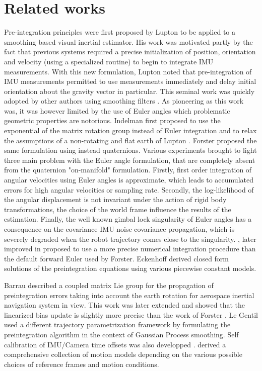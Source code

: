 \section{Related works}

Pre-integration principles were first proposed by Lupton \cite{lupton-09} to be applied to a smoothing based visual inertial estimator. His work was motivated partly 
by the fact that previous systems required a precise initialization of position, orientation and velocity (using a specialized routine) to begin to integrate IMU measurements. 
With this new formulation, Lupton noted that pre-integration of IMU measurements permitted to use measurements immediately and delay initial orientation about the gravity
vector in particular. 
This seminal work was quickly adopted by other authors using smoothing filters \cite{carlone2014eliminating}. As pioneering as this work was, it was however 
limited by the use of Euler angles which problematic geometric properties are notorious. Indelman \cite{Indelman-2013-7768} first proposed to use the exponential of the 
matrix rotation group instead of Euler integration and to relax the assumptions of a non-rotating and flat earth of Lupton \cite{lupton-09}. Forster \cite{forster2015imu, forster2017-TRO}
proposed the same formulation using instead quaternions. Various experiments brought to light three main problem with the Euler angle formulation, that are completely absent 
from the quaternion "on-manifold" formulation. Firstly, first order integration of angular velocities using Euler angles is approximate, which leads to accumulated errors 
for high angular velocities or sampling rate.  Secondly, the log-likelihood of the angular displacement is not invariant under the action of rigid body transformations, 
\eg the choice of the world frame influence the results of the estimation. Finally, the well known gimbal lock singularity of Euler angles has a consequence 
on the covariance IMU noise covariance propagation, which is severely degraded when the robot trajectory comes close to the singularity. 
\cite{shen2015tightly}, later improved in \cite{qin2018vins} proposed to use a more precise numerical integration procedure than the default forward Euler used by Forster. 
Eckenhoff \cite{eckenhoff2019closed} derived closed form solutions of the preintegration equations using various piecewise constant models.

Barrau \cite{barrau2020mathematical} described a coupled matrix Lie group for the propagation of preintegration errors taking into account the earth rotation for aerospace
inertial navigation system in view. This work was later extended \cite{brossard2021associating} and showed that the linearized bias update is slightly more precise than 
the work of Forster \cite{forster2017-TRO}. Le Gentil \cite{le2020gaussian} used a different trajectory parametrization framework by formulating the preintegration algorithm 
in the context of Gaussian Process smoothing. Self calibration of IMU/Camera time offsets was also developped \cite{yang2020analytic}. 
\cite{luo2021unified} derived a comprehensive collection of motion models depending on the various possible choices of reference frames and motion conditions. 


